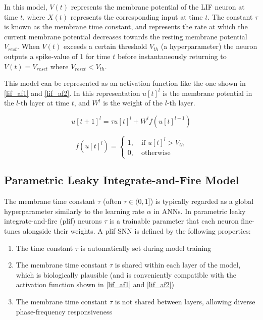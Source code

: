 \documentclass[../main.tex]{subfiles}
\begin{document}
In this model, $V(t)$ represents the membrane potential of the LIF neuron at time $t$, where $X(t)$ represents the corresponding input at time $t$. The constant $\tau$ is known as the membrane time constant, and represents the rate at which the current membrane potential decreases towards the resting membrane potential $V_{rest}$. When $V(t)$ exceeds a certain threshold $V_{th}$ (a hyperparameter) the neuron outputs a spike-value of 1 for time $t$ before instantaneously returning to $V(t)=V_{reset}$ where $V_{reset}<V_{th}$\cite{plif}.

\par This model can be represented as an activation function like the one shown in \eqref{lif_af1} and \eqref{lif_af2}\cite{STAtten}. In this representation $u[t]^l$ is the membrane potential in the $l$-th layer at time $t$, and $W^l$ is the weight of the $l$-th layer\cite{STAtten}.

\begin{equation}\label{lif_af1}
u[t+1]^l=\tau u[t]^l + W^l f(u[t]^{l-1})
\end{equation}

\begin{equation}\label{lif_af2}
f(u[t]^{l})=
\begin{cases} 
  1,\quad\text{if } u[t]^{l} > V_{th} \\
  0,\quad\text{otherwise}
\end{cases}
\end{equation}

\subsection{Parametric Leaky Integrate-and-Fire Model}

The membrane time constant $\tau$ (often $\tau\in(0,1]$\cite{STAtten}) is typically regarded as a global hyperparameter\cite{plif} similarly to the learning rate $\alpha$ in ANNs. In parametric leaky integrate-and-fire (plif) neurons $\tau$ is a trainable parameter that each neuron fine-tunes alongside their weights. A plif SNN is defined by the following properties:\cite{plif}

\begin{enumerate}

\item The time constant $\tau$ is automatically set during model training

\item The membrane time constant $\tau$ is shared within each layer of the model, which is biologically plausible (and is conveniently compatible with the activation function shown in \eqref{lif_af1} and \eqref{lif_af2})

\item The membrane time constant $\tau$ is not shared between layers, allowing diverse phase-frequency
responsiveness

\end{enumerate}
\end{document}
